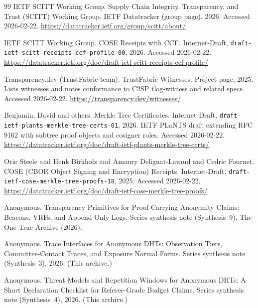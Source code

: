 \documentclass[11pt]{article}
\begin{document}
\begin{thebibliography}{99}
{IETF SCITT Working Group}.
\newblock Supply Chain Integrity, Transparency, and Trust ({SCITT}) Working Group.
\newblock IETF Datatracker (group page), 2026.
\newblock Accessed 2026-02-22.
\newblock \url{https://datatracker.ietf.org/group/scitt/about/}

{IETF SCITT Working Group}.
\newblock COSE Receipts with CCF.
\newblock Internet-Draft, \texttt{draft-ietf-scitt-receipts-ccf-profile-00}, 2026.
\newblock Accessed 2026-02-22.
\newblock \url{https://datatracker.ietf.org/doc/draft-ietf-scitt-receipts-ccf-profile/}

{Transparency.dev (TrustFabric team)}.
\newblock TrustFabric Witnesses.
\newblock Project page, 2025.
\newblock Lists witnesses and notes conformance to C2SP tlog-witness and related specs. Accessed 2026-02-22.
\newblock \url{https://transparency.dev/witnesses/}

Benjamin, David and others.
\newblock Merkle Tree Certificates.
\newblock Internet-Draft, \texttt{draft-ietf-plants-merkle-tree-certs-01}, 2026.
\newblock IETF PLaNTS draft extending RFC 9162 with subtree proof objects and cosigner roles. Accessed 2026-02-22.
\newblock \url{https://datatracker.ietf.org/doc/draft-ietf-plants-merkle-tree-certs/}

Orie Steele and Henk Birkholz and Amaury Delignat-Lavaud and Cedric Fournet.
\newblock COSE (CBOR Object Signing and Encryption) Receipts.
\newblock Internet-Draft, \texttt{draft-ietf-cose-merkle-tree-proofs-18}, 2025.
\newblock Accessed 2026-02-22.
\newblock \url{https://datatracker.ietf.org/doc/draft-ietf-cose-merkle-tree-proofs/}


Anonymous.
\newblock Transparency Primitives for Proof-Carrying Anonymity Claims: Beacons, VRFs, and Append-Only Logs.
\newblock Series synthesis note (Synthesis~9), The-One-True-Archive (2026).

Anonymous.
\newblock Trace Interfaces for Anonymous DHTs: Observation Tiers, Committee-Contact Traces, and Exposure Normal Forms.
\newblock Series synthesis note (Synthesis~3), 2026. (This archive.)

Anonymous.
\newblock Threat Models and Repetition Windows for Anonymous DHTs: A Short Declaration Checklist for Referee-Grade Budget Claims.
\newblock Series synthesis note (Synthesis~4), 2026. (This archive.)


\end{thebibliography}
\end{document}
